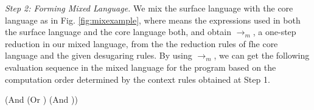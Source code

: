 {\em Step 2: Forming Mixed Language.}
We mix the surface language with the core language as in Fig. \ref{fig:mixexample}, where  means the expressions used in both the surface language and the core language both, and obtain $\to_m$, a one-step reduction in our mixed language, from the the reduction rules of fhe core language and the given desugaring rules. By using $\to_m$, we can get the following evaluation sequence in the mixed language for
the program  based on the computation order determined by the context rules obtained at Step 1.

{\footnotesize
\begin{Codes}
    (And (Or \true \false) (And \false \true))
\OneStep{ \false}
\end{Codes}
}


